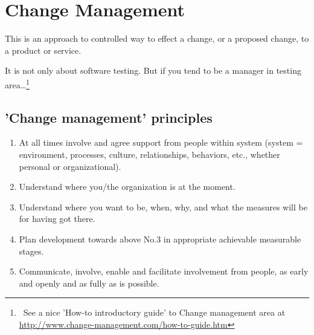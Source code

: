 \section{Change Management}
\label{sec:Change Management}

This is an approach to controlled way to effect a change, or a proposed change, to a product or service.

It is not only about software testing. But if you tend to be a manager in testing area\ldots\footnote{~See a nice 'How-to introductory guide' to Change management area at \url{http://www.change-management.com/how-to-guide.htm}}

\subsection{'Change management' principles}
\label{sec:'Change management' principles}

        \begin{enumerate}
\item 
At all times involve and agree support from people within system (system = environment, processes, culture, relationships, behaviors, etc., whether personal or organizational).
\item 
        Understand where you/the organization is at the moment.
\item 
        Understand where you want to be, when, why, and what the measures will be for having got there.
\item 
        Plan development towards above No.3 in appropriate achievable measurable stages.
\item 
        Communicate, involve, enable and facilitate involvement from people, as early and openly and as fully as is possible.                                                                                                                             \end{enumerate}
